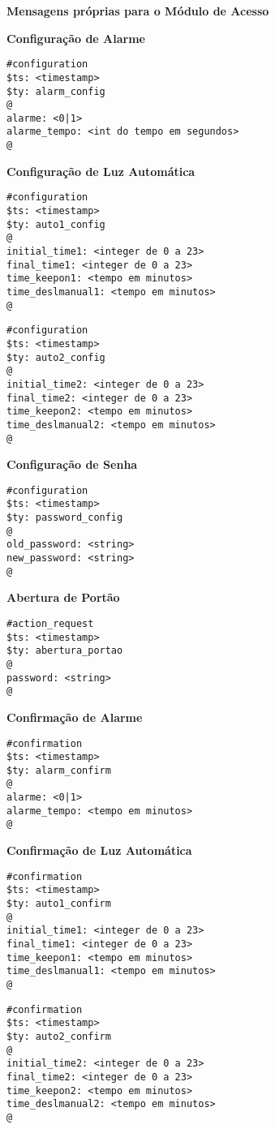 \textbf{Mensagens próprias para o Módulo de Acesso}


\textbf{Configuração de Alarme}
\begin{lstlisting}
#configuration
$ts: <timestamp>
$ty: alarm_config
@
alarme: <0|1>
alarme_tempo: <int do tempo em segundos>
@
\end{lstlisting}

\textbf{Configuração de Luz Automática}
\begin{lstlisting}
#configuration
$ts: <timestamp>
$ty: auto1_config
@
initial_time1: <integer de 0 a 23>
final_time1: <integer de 0 a 23>
time_keepon1: <tempo em minutos>
time_deslmanual1: <tempo em minutos>
@
\end{lstlisting}

\begin{lstlisting}
#configuration
$ts: <timestamp>
$ty: auto2_config
@
initial_time2: <integer de 0 a 23>
final_time2: <integer de 0 a 23>
time_keepon2: <tempo em minutos>
time_deslmanual2: <tempo em minutos>
@
\end{lstlisting}

\textbf{Configuração de Senha}
\begin{lstlisting}
#configuration
$ts: <timestamp>
$ty: password_config
@
old_password: <string>
new_password: <string>
@
\end{lstlisting}

\textbf{Abertura de Portão}
\begin{lstlisting}
#action_request
$ts: <timestamp>
$ty: abertura_portao
@
password: <string>
@
\end{lstlisting}

\textbf{Confirmação de Alarme}
\begin{lstlisting}
#confirmation
$ts: <timestamp>
$ty: alarm_confirm
@
alarme: <0|1>
alarme_tempo: <tempo em minutos>
@
\end{lstlisting}

\textbf{Confirmação de Luz Automática}
\begin{lstlisting}
#confirmation
$ts: <timestamp>
$ty: auto1_confirm
@
initial_time1: <integer de 0 a 23>
final_time1: <integer de 0 a 23>
time_keepon1: <tempo em minutos>
time_deslmanual1: <tempo em minutos>
@
\end{lstlisting}

\begin{lstlisting}
#confirmation
$ts: <timestamp>
$ty: auto2_confirm
@
initial_time2: <integer de 0 a 23>
final_time2: <integer de 0 a 23>
time_keepon2: <tempo em minutos>
time_deslmanual2: <tempo em minutos>
@
\end{lstlisting}

